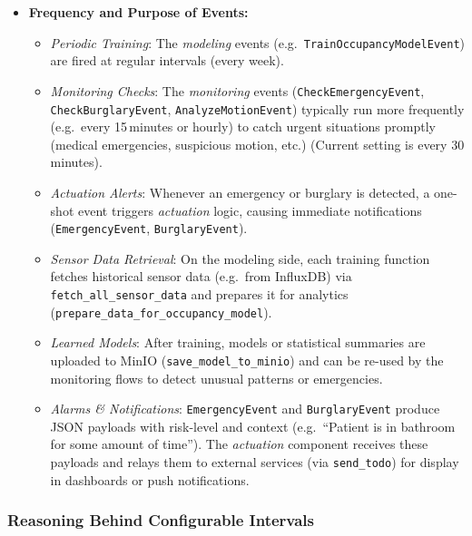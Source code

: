 \documentclass[A4,10pt]{article}
\begin{document}
\begin{itemize}
    \item \textbf{Frequency and Purpose of Events:}
    \begin{itemize}
        \item \emph{Periodic Training}: The \emph{modeling} events (e.g.\ \texttt{TrainOccupancyModelEvent}) are fired at regular intervals (every week).
        \item \emph{Monitoring Checks}: The \emph{monitoring} events (\texttt{CheckEmergencyEvent}, \texttt{CheckBurglaryEvent}, \texttt{AnalyzeMotionEvent}) typically run more frequently (e.g.\ every 15\,minutes or hourly) to catch urgent situations promptly (medical emergencies, suspicious motion, etc.) (Current setting is every 30 minutes).
        \item \emph{Actuation Alerts}: Whenever an emergency or burglary is detected, a one-shot event triggers \emph{actuation} logic, causing immediate notifications (\texttt{EmergencyEvent}, \texttt{BurglaryEvent}).
        \item \emph{Sensor Data Retrieval}: On the modeling side, each training function fetches historical sensor data (e.g.\ from InfluxDB) via \texttt{fetch\_all\_sensor\_data} and prepares it for analytics (\texttt{prepare\_data\_for\_occupancy\_model}).
        \item \emph{Learned Models}: After training, models or statistical summaries are uploaded to MinIO (\texttt{save\_model\_to\_minio}) and can be re-used by the monitoring flows to detect unusual patterns or emergencies.
        \item \emph{Alarms \& Notifications}: \texttt{EmergencyEvent} and \texttt{BurglaryEvent} produce JSON payloads with risk-level and context (e.g.\ “Patient is in bathroom for some amount of time”). The \textit{actuation} component receives these payloads and relays them to external services (via \texttt{send\_todo}) for display in dashboards or push notifications.
    \end{itemize}
\end{itemize}

\subsubsection*{Reasoning Behind Configurable Intervals}
\end{document}
